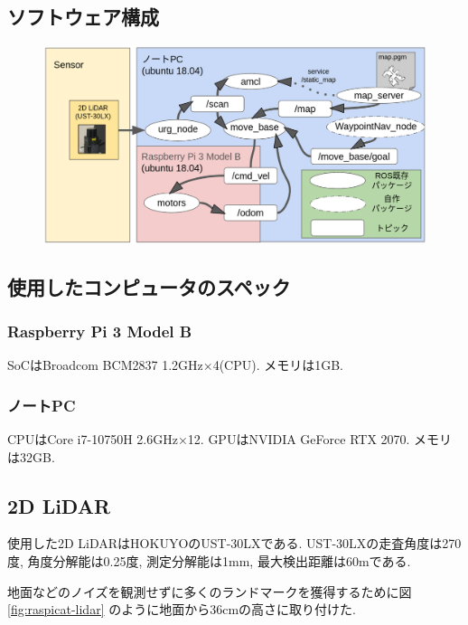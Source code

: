 \subsection{ソフトウェア構成}

\begin{figure}[H]
	\begin{center}
		\includegraphics[width=1.0\linewidth]{figs/raspicat-software-config.png}
		\caption{}
		\label{fig:raspicat-software-config}
	\end{center}
\end{figure}

\subsection{使用したコンピュータのスペック}

\subsubsection{Raspberry Pi 3 Model B}
SoCはBroadcom BCM2837 1.2GHz×4(CPU).
メモリは1GB.
\subsubsection{ノートPC}
CPUはCore i7-10750H 2.6GHz×12. 
GPUはNVIDIA GeForce RTX 2070.
メモリは32GB.

\subsection{2D LiDAR}
使用した2D LiDARはHOKUYOのUST-30LXである.
UST-30LXの走査角度は270度, 角度分解能は0.25度, 測定分解能は1mm, 最大検出距離は60mである.

地面などのノイズを観測せずに多くのランドマークを獲得するために図\ref{fig:raspicat-lidar}
のように地面から36cmの高さに取り付けた.

